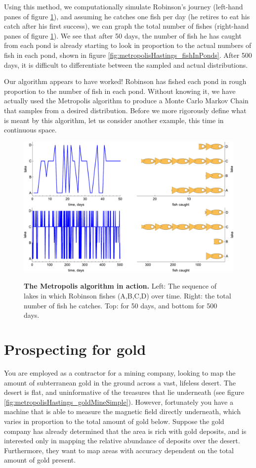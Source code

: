\documentclass[11pt,fullpage]{book}
\begin{document}
Using this method, we computationally simulate Robinson's journey (left-hand panes of figure \ref{fig:metropolisHastings_MetropolisFish}), and assuming he catches one fish per day (he retires to eat his catch after his first success), we can graph the total number of fishes (right-hand panes of figure \ref{fig:metropolisHastings_MetropolisFish}). We see that after 50 days, the number of fish he has caught from each pond is already starting to look in proportion to the actual numbers of fish in each pond, shown in figure \ref{fig:metropolisHastings_fishInPonds}. After 500 days, it is difficult to differentiate between the sampled and actual distributions. 

Our algorithm appears to have worked! Robinson has fished each pond in rough proportion to the number of fish in each pond. Without knowing it, we have actually used the Metropolis algorithm to produce a Monte Carlo Markov Chain that samples from a desired distribution. Before we more rigorously define what is meant by this algorithm, let us consider another example, this time in continuous space.

\begin{figure}
\centering
\scalebox{0.4} 
{\includegraphics{metropolisHastings_metropolisFish.pdf}}
\caption{\textbf{The Metropolis algorithm in action.} Left: The sequence of lakes in which Robinson fishes (A,B,C,D) over time. Right: the total number of fish he catches. Top: for 50 days, and bottom for 500 days.}\label{fig:metropolisHastings_MetropolisFish}
\end{figure}

\section{Prospecting for gold}
You are employed as a contractor for a mining company, looking to map the amount of subterranean gold in the ground across a vast, lifeless desert. The desert is flat, and uninformative of the treasures that lie underneath (see figure \ref{fig:metropolisHastings_goldMineSimple}). However, fortunately you have a machine that is able to measure the magnetic field directly underneath, which varies in proportion to the total amount of gold below. Suppose the gold company has already determined that the area is rich with gold deposits, and is interested only in mapping the relative abundance of deposits over the desert. Furthermore, they want to map areas with accuracy dependent on the total amount of gold present.
\end{document}
